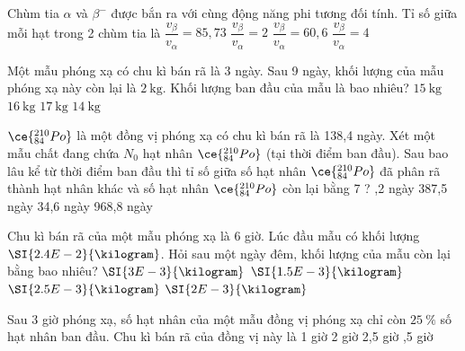 \begin{ex}
	Chùm tia $\alpha$ và $\beta^-$ được bắn ra với cùng động năng phi tương đối tính. Tỉ số giữa mỗi hạt trong 2 chùm tia là
	\choice
	{\True $\dfrac{v_\beta}{v_\alpha}=85,73$}
	{$\dfrac{v_\beta}{v_\alpha}=2$}
	{$\dfrac{v_\beta}{v_\alpha}=60,6$}
	{$\dfrac{v_\beta}{v_\alpha}=4$}
\end{ex}
\begin{ex}
	Một mẫu phóng xạ có chu kì bán rã là 3 ngày. Sau 9 ngày, khối lượng của mẫu phóng xạ này còn lại là $\SI{2}{\kilogram}$. Khối lượng ban đầu của mẫu là bao nhiêu?
	\choice
	{$\SI{15}{\kilogram}$}
	{\True $\SI{16}{\kilogram}$}
	{$\SI{17}{\kilogram}$}
	{$\SI{14}{\kilogram}$}
	\loigiai{
	
	}
\end{ex}
\begin{ex}
	$\ce{_{84}^{210}Po}$ là một đồng vị phóng xạ có chu kì bán rã là 138,4 ngày. Xét một mẫu chất đang chứa $N_0$ hạt nhân $\ce{_{84}^{210}Po}$ (tại thời điểm ban đầu). Sau bao lâu kể từ thời điểm ban đầu thì tỉ số giữa số hạt nhân $\ce{_{84}^{210}Po}$ đã phân rã thành hạt nhân khác và số hạt nhân $\ce{_{84}^{210}Po}$ còn lại bằng 7 ?
	\choice
	{,2 ngày}
	{387,5 ngày}
	{34,6 ngày}
	{968,8 ngày}
\end{ex}
\begin{ex}
	Chu kì bán rã của một mẫu phóng xạ là 6 giờ. Lúc đầu mẫu có khối lượng $\SI{2.4E-2}{\kilogram}$. Hỏi sau một ngày đêm, khối lượng của mẫu còn lại bằng bao nhiêu?
	\choice
	{$\SI{3E-3}{\kilogram}$}
	{\True $\SI{1.5E-3}{\kilogram}$}
	{$\SI{2.5E-3}{\kilogram}$}
	{$\SI{2E-3}{\kilogram}$}
	\loigiai{}
\end{ex}
\begin{ex}
	Sau 3 giờ phóng xạ, số hạt nhân của một mẫu đồng vị phóng xạ chỉ còn $\SI{25}{\percent}$ số hạt nhân ban đầu. Chu kì bán rã của đồng vị này là
	\choice
	{1 giờ}
	{2 giờ}
	{2,5 giờ}
	{,5 giờ}
	\loigiai{}
\end{ex}
